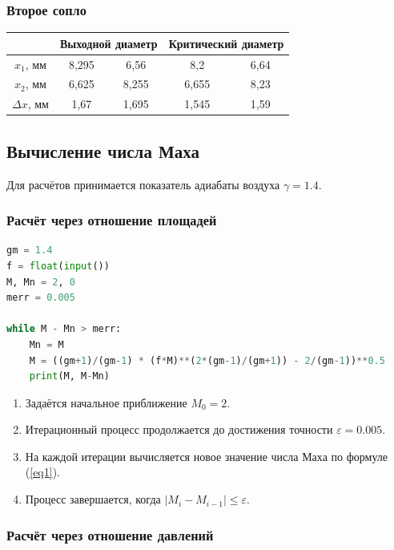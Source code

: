\documentclass[12pt,a4paper]{article}
\begin{document}
\subsubsection{Второе сопло}

\begin{center}
\begin{tabular}{|c|c|c|c|c|}
\hline
& \multicolumn{2}{c|}{{Выходной диаметр}} & \multicolumn{2}{c|}{{Критический диаметр}} \\
\hline
$x_1$, мм & 8,295 & 6,56 & 8,2 & 6,64 \\
\hline
$x_2$, мм & 6,625 & 8,255 & 6,655 & 8,23 \\
\hline
$\Delta x$, мм & 1,67 & 1,695 & 1,545 & 1,59 \\
\hline
\end{tabular}
\end{center}

\subsection{Вычисление числа Маха}

Для расчётов принимается показатель адиабаты воздуха $\gamma = 1.4$.

\subsubsection{Расчёт через отношение площадей}

\begin{lstlisting}[language=Python, caption={Расчёт числа Маха через отношение площадей}]
gm = 1.4
f = float(input())
M, Mn = 2, 0
merr = 0.005

while M - Mn > merr:
    Mn = M
    M = ((gm+1)/(gm-1) * (f*M)**(2*(gm-1)/(gm+1)) - 2/(gm-1))**0.5
    print(M, M-Mn)
\end{lstlisting}

\begin{enumerate}
    \item Задаётся начальное приближение $M_0 = 2$.
    \item Итерационный процесс продолжается до достижения точности $\varepsilon = 0.005$.
    \item На каждой итерации вычисляется новое значение числа Маха по формуле (\ref{eq1}).
    \item Процесс завершается, когда $|M_i - M_{i-1}| \leq \varepsilon$.
\end{enumerate}

\subsubsection{Расчёт через отношение давлений}
\end{document}

